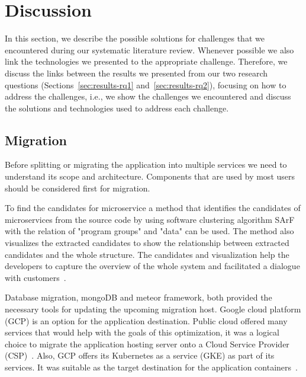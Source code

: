 
\section{Discussion}\label{sec:discussion}

In this section, we describe the possible solutions for challenges that we encountered during our systematic literature review. Whenever possible we also link the technologies we presented to the appropriate challenge. Therefore, we discuss the links between the results we presented from our two research questions (Sections~\ref{sec:results-rq1} and~\ref{sec:results-rq2}), focusing on how to address the challenges, i.e., we show the challenges we encountered and discuss the solutions and technologies used to address each challenge.

\subsection{Migration}%

\par Before splitting or migrating the application into multiple services we need to understand its scope and architecture. Components that are used by most users should be considered first for migration. 

\par To find the candidates for microservice a method that identifies the candidates of microservices from the source code by using software clustering algorithm SArF with the relation of "program groups" and "data" can be used. The method also visualizes the extracted candidates to show the relationship between extracted candidates and the whole structure. The candidates and visualization help the developers to capture the overview of the whole system and facilitated a dialogue with customers~\cite{Kamimura2018}.

\par Database migration, mongoDB and meteor framework, both provided the necessary tools for updating the upcoming migration host. Google cloud platform (GCP) is an option for the application destination. Public cloud offered many services that would help with the goals of this optimization, it was a logical choice to migrate the application hosting server onto a Cloud Service Provider (CSP)~\cite{Tuuli2020}. Also, GCP offers its Kubernetes as a service (GKE) as part of its services. It was suitable as the target destination for the application containers~\cite{haugeland2020}. 

